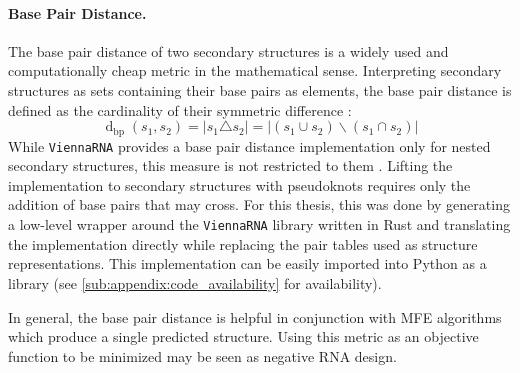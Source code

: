\documentclass[../../master.tex]{subfiles}
\begin{document}
\paragraph{Base Pair Distance.}
\label{par:methods:bpdistance}

The base pair distance of two secondary structures is a widely used and computationally cheap metric in the mathematical sense.
Interpreting secondary structures as sets containing their base pairs as elements, the base pair distance is defined as the cardinality of their symmetric difference \parencite{lorenz_rna_2014}:
\begin{equation}\label{eq:bpdistance}
	\operatorname{d}_{\mathrm{bp}}(s_1, s_2) = |s_1 \triangle s_2| = |(s_1 \cup s_2) \smallsetminus (s_1 \cap s_2)|
\end{equation}
While \texttt{ViennaRNA} provides a base pair distance implementation only for nested secondary structures, this measure is not restricted to them \parencite{haslinger_rna_1999}. 
Lifting the implementation to secondary structures with pseudoknots requires only the addition of base pairs that may cross.
For this thesis, this was done by generating a low-level wrapper around the \texttt{ViennaRNA} library written in Rust and translating the implementation directly while replacing the pair tables used as structure representations. 
This implementation can be easily imported into Python as a library (see \autoref{sub:appendix:code_availability} for availability). 

In general, the base pair distance is helpful in conjunction with MFE algorithms which produce a single predicted structure.
Using this metric as an objective function to be minimized may be seen as negative RNA design. 



\end{document}
